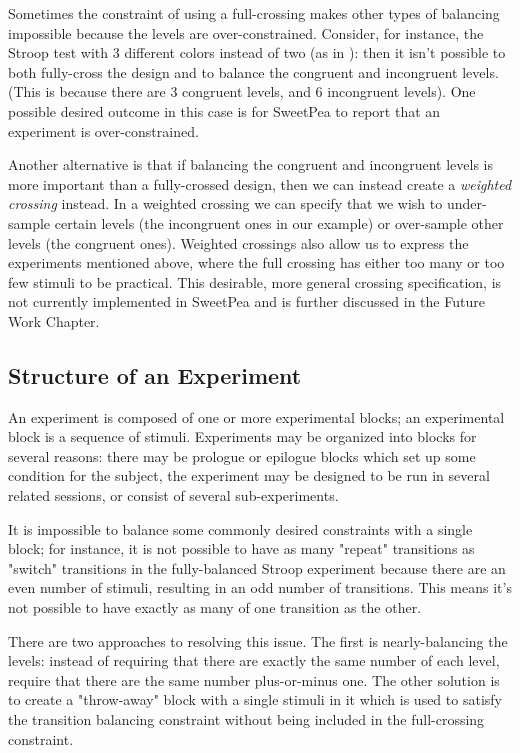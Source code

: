 Sometimes the constraint of using a full-crossing makes other types of balancing impossible because the levels are over-constrained. Consider, for instance, the Stroop test with 3 different colors instead of two (as in ): then it isn't possible to both fully-cross the design and to balance the congruent and incongruent levels. (This is because there are 3 congruent levels, and 6 incongruent levels). One possible desired outcome in this case is for SweetPea to report that an experiment is over-constrained.

Another alternative is that if balancing the congruent and incongruent levels is more important than a fully-crossed design, then we can instead create a \emph{weighted crossing} instead. In a weighted crossing we can specify that we wish to under-sample certain levels (the incongruent ones in our example) or over-sample other levels (the congruent ones). Weighted crossings also allow us to express the experiments mentioned above, where the full crossing has either too many or too few stimuli to be practical. This desirable, more general crossing specification, is not currently implemented in SweetPea and is further discussed in the Future Work Chapter.

\subsection{Structure of an Experiment}

An experiment is composed of one or more experimental blocks; an experimental block is a sequence of stimuli. Experiments may be organized into blocks for several reasons: there may be prologue or epilogue blocks which set up some condition for the subject, the experiment may be designed to be run in several related sessions, or consist of several sub-experiments.

It is impossible to balance some commonly desired constraints with a single block; for instance, it is not possible to have as many "repeat" transitions as "switch" transitions in the fully-balanced Stroop experiment because there are an even number of stimuli, resulting in an odd number of transitions. This means it's not possible to have exactly as many of one transition as the other.

There are two approaches to resolving this issue. The first is nearly-balancing the levels: instead of requiring that there are exactly the same number of each level, require that there are the same number plus-or-minus one. The other solution is to create a "throw-away" block with a single stimuli in it which is used to satisfy the transition balancing constraint without being included in the full-crossing constraint.

